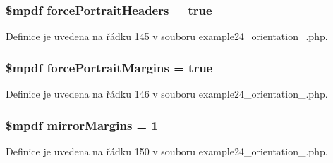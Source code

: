 \hypertarget{example24__orientation__2_8php_af27b5dac57e9f3a8b4019a1b3b9535fb}{
\subsubsection[{force\-Portrait\-Headers}]{\setlength{\rightskip}{0pt plus 5cm}\$mpdf force\-Portrait\-Headers = true}}\label{example24__orientation__2_8php_af27b5dac57e9f3a8b4019a1b3b9535fb}


Definice je uvedena na řádku 145 v souboru example24\-\_\-orientation\-\_.\-php.

\hypertarget{example24__orientation__2_8php_a94dd6299d1daea6eb83470539c3c6ec1}{
\subsubsection[{force\-Portrait\-Margins}]{\setlength{\rightskip}{0pt plus 5cm}\$mpdf force\-Portrait\-Margins = true}}\label{example24__orientation__2_8php_a94dd6299d1daea6eb83470539c3c6ec1}


Definice je uvedena na řádku 146 v souboru example24\-\_\-orientation\-\_.\-php.

\hypertarget{example24__orientation__2_8php_a24c284cb7774410f65953584ea1fd9c1}{
\subsubsection[{mirror\-Margins}]{\setlength{\rightskip}{0pt plus 5cm}\$mpdf mirror\-Margins = 1}}\label{example24__orientation__2_8php_a24c284cb7774410f65953584ea1fd9c1}


Definice je uvedena na řádku 150 v souboru example24\-\_\-orientation\-\_.\-php.

